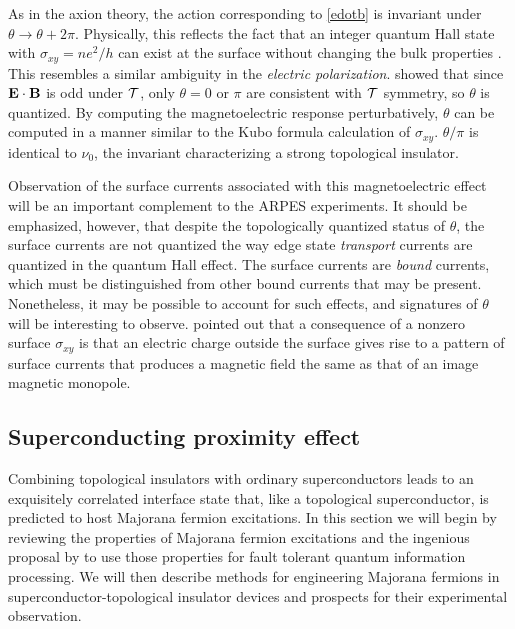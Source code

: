 \documentclass[twocolumn,floatfix,showpacs,rmp,aps]{revtex4}
\begin{document}
	As in the axion theory, the action corresponding to \eqref{edotb} is invariant under
	$\theta \rightarrow \theta+2\pi$.  Physically, this reflects the fact
	that an integer quantum Hall state with $\sigma_{xy}=ne^2/h$
	can exist at the surface without changing the bulk properties \cite{essin09}.
	This resembles a similar ambiguity in the
	{\it electric polarization}.
	\textcite{qihugheszhang08} showed that
	since ${\bf E}\cdot{\bf B}$ is odd under ${\cal T}$,
	only $\theta=0$ or $\pi$ are consistent with ${\cal T}$ symmetry,
	so $\theta$ is quantized.
	By computing the magnetoelectric response perturbatively,
	$\theta$ can be computed in a
	manner similar to the Kubo formula calculation of $\sigma_{xy}$.
	$\theta/\pi$ is identical to $\nu_0$, the invariant
	characterizing a strong topological insulator.
	
	Observation of the surface currents associated with this magnetoelectric effect
	will be an important complement to the ARPES experiments.  It should be
	emphasized, however, that despite the topologically quantized status of
	$\theta$, the surface currents are not quantized the way edge state {\it transport} currents
	are quantized in the quantum Hall effect.  The
	surface currents are {\it bound} currents, which must be distinguished from
	other bound currents that may be present.  Nonetheless, it may be possible to
	account for such effects, and signatures of $\theta$
	will be interesting to observe.  \textcite{qizhang09} pointed out that a
	consequence of a nonzero surface $\sigma_{xy}$ is that an electric
	charge outside the surface gives rise to a pattern of surface
	currents that produces a magnetic field the same as that of an image
	magnetic monopole.
	
	\subsection{Superconducting proximity effect}
	\label{sec:proximity}
	
	Combining topological insulators with ordinary superconductors leads
	to an exquisitely correlated interface state that, like a topological
	superconductor, is predicted to host Majorana fermion excitations.
	In this section we will begin by reviewing the properties of Majorana
	fermion excitations and the ingenious proposal by \textcite{kitaev03} to use those
	properties for fault tolerant quantum information processing.  We
	will then describe methods for engineering Majorana fermions in
	superconductor-topological insulator devices and prospects for their
	experimental observation.
	
\end{document}
